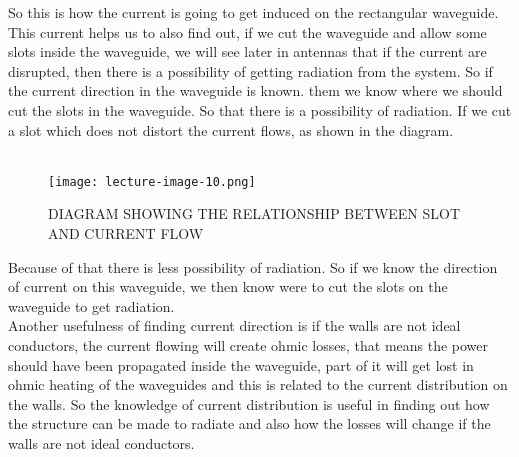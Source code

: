 	So this is how the current is going to get induced on the rectangular waveguide. This current helps us to also find out, if we cut the waveguide and allow some slots inside the waveguide, we will see later in antennas that if the current are disrupted, then there is a possibility of getting radiation from the system. So if the current direction in the waveguide is known. them we know where we should cut the slots in the waveguide. So that there is a possibility of radiation. If we cut a slot which does not distort the current flows, as shown in the diagram.\\\\
	
	\begin{figure}[H]
		\centering
		\texttt{[image: lecture-image-10.png]}
		\caption{DIAGRAM SHOWING THE RELATIONSHIP BETWEEN SLOT AND CURRENT FLOW}
	\end{figure}
	
	 Because of that there is less possibility of radiation. So if we know the direction of current on this waveguide, we then know were to cut the slots on the waveguide to get radiation.\\
	Another usefulness of finding current direction is if the walls are not ideal conductors, the current flowing will create ohmic losses, that means the power should have been propagated inside the waveguide, part of it will get lost in ohmic heating of the waveguides and this is related to the current distribution on the walls.
	So the knowledge of current distribution is useful in finding out how the structure can be made to radiate and also how the losses will change if the walls are not ideal conductors.\newline
		
